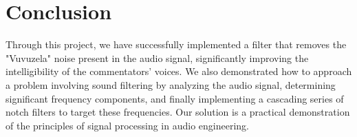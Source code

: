 \newpage
\section{Conclusion}
Through this project, we have successfully implemented a filter that removes the "Vuvuzela" noise present in the audio signal, significantly improving the intelligibility of the commentators' voices. We also demonstrated how to approach a problem involving sound filtering by analyzing the audio signal, determining significant frequency components, and finally implementing a cascading series of notch filters to target these frequencies. Our solution is a practical demonstration of the principles of signal processing in audio engineering.
